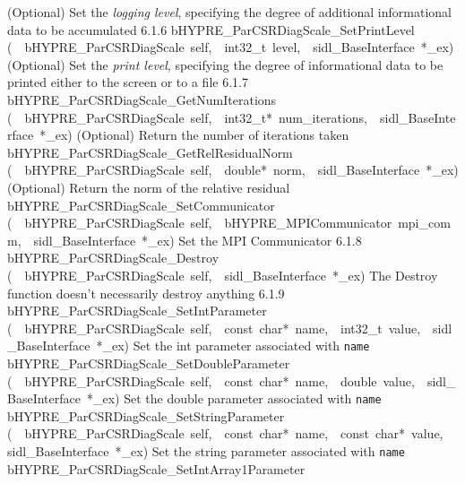 \documentclass{article}
\begin{document}
\begin{cxxentry}
\begin{cxxentry}
\begin{cxxnames}
        {
(Optional) Set the {\it logging level}, specifying the degree
of additional informational data to be accumulated}
        {6.1.6}
        {bHYPRE\_ParCSRDiagScale\_SetPrintLevel}
        {(\ \ bHYPRE\_ParCSRDiagScale\ self,\ \ int32\_t\ level,\ \ sidl\_BaseInterface\ *\_ex)}
        {
(Optional) Set the {\it print level}, specifying the degree
of informational data to be printed either to the screen or
to a file}
        {6.1.7}
        {bHYPRE\_ParCSRDiagScale\_GetNumIterations}
        {(\ \ bHYPRE\_ParCSRDiagScale\ self,\ \ int32\_t*\ num\_iterations,\ \ sidl\_BaseInterface\ *\_ex)}
        {
(Optional) Return the number of iterations taken}
        {}
\label{cxx.6.1.15}
        {bHYPRE\_ParCSRDiagScale\_GetRelResidualNorm}
        {(\ \ bHYPRE\_ParCSRDiagScale\ self,\ \ double*\ norm,\ \ sidl\_BaseInterface\ *\_ex)}
        {
(Optional) Return the norm of the relative residual}
        {}
\label{cxx.6.1.16}
        {bHYPRE\_ParCSRDiagScale\_SetCommunicator}
        {(\ \ bHYPRE\_ParCSRDiagScale\ self,\ \ bHYPRE\_MPICommunicator\ mpi\_comm,\ \ sidl\_BaseInterface\ *\_ex)}
        {
Set the MPI Communicator}
        {6.1.8}
        {bHYPRE\_ParCSRDiagScale\_Destroy}
        {(\ \ bHYPRE\_ParCSRDiagScale\ self,\ \ sidl\_BaseInterface\ *\_ex)}
        {
The Destroy function doesn't necessarily destroy anything}
        {6.1.9}
        {bHYPRE\_ParCSRDiagScale\_SetIntParameter}
        {(\ \ bHYPRE\_ParCSRDiagScale\ self,\ \ const\ char*\ name,\ \ int32\_t\ value,\ \ sidl\_BaseInterface\ *\_ex)}
        {
Set the int parameter associated with {\tt name}}
        {}
\label{cxx.6.1.17}
        {bHYPRE\_ParCSRDiagScale\_SetDoubleParameter}
        {(\ \ bHYPRE\_ParCSRDiagScale\ self,\ \ const\ char*\ name,\ \ double\ value,\ \ sidl\_BaseInterface\ *\_ex)}
        {
Set the double parameter associated with {\tt name}}
        {}
\label{cxx.6.1.18}
        {bHYPRE\_ParCSRDiagScale\_SetStringParameter}
        {(\ \ bHYPRE\_ParCSRDiagScale\ self,\ \ const\ char*\ name,\ \ const\ char*\ value,\ \ sidl\_BaseInterface\ *\_ex)}
        {
Set the string parameter associated with {\tt name}}
        {}
\label{cxx.6.1.19}
        {bHYPRE\_ParCSRDiagScale\_SetIntArray1Parameter}

\end{cxxnames}
\end{cxxentry}
\end{cxxentry}
\end{document}
